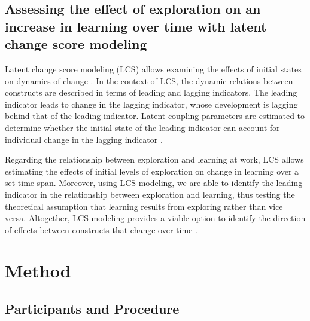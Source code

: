 \documentclass[man, 12pt, a4paper, noextraspace]{apa6}
\begin{document}
\subsection{Assessing the effect of exploration on an increase in learning over time with latent change score modeling}

Latent change score modeling (LCS) allows examining the effects of initial states on dynamics of change \parencite{McArdle2009, McArdle2001}.
In the context of LCS, the dynamic relations between constructs are described in terms of leading and lagging indicators.
The leading indicator leads to change in the lagging indicator, whose development is lagging behind that of the leading indicator. 
Latent coupling parameters are estimated to determine whether the initial state of the leading indicator can account for individual change in the lagging indicator \parencite{Ferrer2010, McArdle2009}. \par 
Regarding the relationship between exploration and learning at work, LCS allows estimating the effects of initial levels of exploration on change in learning over a set time span. 
Moreover, using LCS modeling, we are able to identify the leading indicator in the relationship between exploration and learning, thus testing the theoretical assumption that learning results from exploring rather than vice versa. 
Altogether, LCS modeling provides a viable option to identify the direction of effects between constructs that change over time \parencite[e.g.,][]{McArdle2001}. 

\section{Method}

\subsection{Participants and Procedure} 
\end{document}
